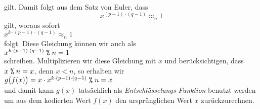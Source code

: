 \\[0.2cm]
gilt.  Damit folgt aus dem Satz von Euler, dass
\begin{equation}
  \label{eq:rsa3}
  x^{(p-1) \cdot (q-1)} \approx_n 1
\end{equation}
gilt, woraus sofort 
\\[0.2cm]
\hspace*{1.3cm}
$x^{k \cdot (p-1) \cdot (q-1)} \approx_n 1$
\\[0.2cm]
folgt.  Diese Gleichung k\"{o}nnen wir auch als
\\[0.2cm]
\hspace*{1.3cm}
$x^{k \cdot (p-1) \cdot (q-1)} \;\texttt{\%}\; n = 1$
\\[0.2cm]
schreiben.  Multiplizieren wir diese Gleichung mit $x$ und ber\"{u}cksichtigen, dass $x \;\texttt{\%}\; n = x$, denn
$x < n$, so erhalten wir
\\[0.2cm]
\hspace*{1.3cm}
$g\bigl(f(x)\bigr) = x \cdot x^{k \cdot (p-1) \cdot (q-1)} \;\texttt{\%}\; n = x$
\\[0.2cm]
und damit kann $g(x)$ tats\"{a}chlich als \emph{Entschl\"{u}sselungs-Funktion} benutzt werden um aus dem 
kodierten Wert $f(x)$ den urspr\"{u}nglichen Wert $x$ zur\"{u}ckzurechnen.
\vspace*{0.3cm}

